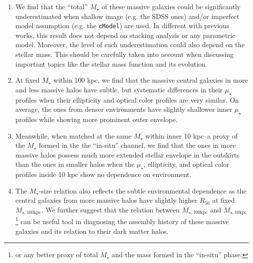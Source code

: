 \documentclass{emulateapj}
\def\mstar{{$M_{\star}$}}
\def\minn{{$M_{\star,10\mathrm{kpc}}$}}
\def\mtot{{$M_{\star,100\mathrm{kpc}}$}}
\def\mden{{$\mu_{\star}$}}
\begin{document}
\begin{CJK*}{UTF8}{gbsn}
    \begin{enumerate}
        \item We find that the ``total'' \mstar{} of these massive galaxies could be 
            significantly underestimated when shallow image (e.g. the SDSS ones) 
            and/or imperfect model assumption (e.g. the \texttt{cModel}) are used.
            In different with previous works, this result does not depend on stacking 
            analysis or any parametric model. 
            Moreover, the level of such underestimation could also depend on the 
            stellar mass. 
            This should be carefully taken into account when discussing important 
            topics like the stellar mass function and its evolution.
        \item At fixed \mstar{} within 100 kpc, we find that the massive central 
            galaxies in more and less massive halos have subtle, but systematic 
            differences in their \mden{} profiles when their ellipticity and optical 
            color profiles are very similar. 
            On average, the ones from denser environments have slightly shallower 
            inner \mden{} profiles while showing more prominent outer envelope.
        \item Meanwhile, when matched at the same \mstar{} within inner 10 kpc--a 
            proxy of the \mstar{} formed in the the ``in-situ'' channel, we find 
            that the ones in more massive halos possess much more extended stellar 
            envelope in the outskirts than the ones in smaller halos when the 
            \mden{}, ellipticity, and optical color profiles inside 10 kpc show 
            no dependence on environment. 
        \item The \mstar{}-size relation also reflects the subtle environmental 
            dependence as the central galaxies from more massive halos have 
            slightly higher $R_{\mathrm{50}}$ at fixed \mtot{}. 
            We further suggest that the relation between \mtot{} and 
            \minn{}\footnote{or any better proxy of total \mstar{} and the mass 
            formed in the ``in-situ'' phase.} can be useful tool in diagnosing the
            assembly history of these massive galaxies and its relation to their 
            dark matter halos.
    \end{enumerate}


\end{CJK*}
\end{document}
